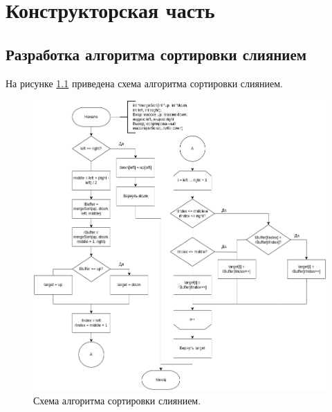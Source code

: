 \chapter{Конструкторская часть}

\section{Разработка алгоритма сортировки слиянием}

На рисунке \ref{img:merge} приведена схема алгоритма сортировки слиянием.
\begin{figure}[h]
	\centering
	\includegraphics[width=170mm]{images/merge}
	\caption{Схема алгоритма сортировки слиянием.}
	\label{img:merge}
\end{figure}
\newpage
